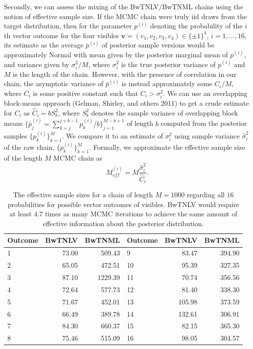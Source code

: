 \documentclass[AMS,STIX1COL]{WileyNJD-v2}
\begin{document}
Secondly, we can assess the mixing of the BwTNLV/BwTNML chains using the
notion of effective sample size. If the MCMC chain were truly iid draws
from the target distribution, then for the parameter \(p^{(i)}\)
denoting the probability of the \(i\)th vector outcome for the four
visibles \(\mathbf{v}=(v_1,v_2,v_3,v_4)\in\{\pm 1\}^4\),
\(i=1,\ldots,16\), its estimate as the average \(\bar{p}^{(i)}\) of
posterior sample versions would be approximately Normal with mean given
by the posterior marginal mean of \(p^{(i)}\), and variance given by
\(\sigma^2_i/M\), where \(\sigma^2_i\) is the true posterior variance of
\(p^{(i)}\) and \(M\) is the length of the chain. However, with the
presence of correlation in our chain, the asymptotic variance of
\(\bar{p}^{(i)}\) is instead approximately some \(C_i/M\), where \(C_i\)
is some positive constant such that \(C_i > \sigma^2_i\). We can use an
overlapping block-means approach (Gelman, Shirley, and others 2011) to
get a crude estimate for \(C_i\) as \(\hat{C}_i = bS_b^2\), where
\(S_b^2\) denotes the sample variance of overlapping block means
\(\{\bar{p}_j^{(i)}=\sum_{k=j}^{j+b-1} p_k^{(i)}/b\}_{j=1}^{M-b+1}\) of
length \(b\) computed from the posterior samples
\(\{p_k^{(i)}\}_{k=1}^M\). We compare it to an estimate of
\(\sigma^2_i\) using sample variance \(\hat{\sigma}^2_i\) of the raw
chain, \(\{p_k^{(i)}\}_{k=1}^{M}\). Formally, we approximate the
effective sample size of the length \(M\) MCMC chain as \[
M_{eff}^{(i)} = M\frac{\hat{\sigma}^2_i}{\hat{C}_i}.
\]

\begin{table}[ht]
\centering
\begin{tabular}{lrrlrr}
  \hline
Outcome & BwTNLV & BwTNML & Outcome & BwTNLV & BwTNML \\ 
  \hline
1 & 73.00 & 509.43 & 9 & 83.47 & 394.90 \\ 
  2 & 65.05 & 472.51 & 10 & 95.39 & 327.35 \\ 
  3 & 87.10 & 1229.39 & 11 & 70.74 & 356.56 \\ 
  4 & 72.64 & 577.73 & 12 & 81.40 & 338.30 \\ 
  5 & 71.67 & 452.01 & 13 & 105.98 & 373.59 \\ 
  6 & 66.49 & 389.78 & 14 & 132.61 & 306.91 \\ 
  7 & 84.30 & 660.37 & 15 & 82.15 & 365.30 \\ 
  8 & 75.46 & 515.09 & 16 & 98.05 & 304.57 \\ 
   \hline
\end{tabular}
\caption{The effective sample sizes for a chain of length $M = 1000$ regarding all $16$ probabilities for possible vector outcomes of visibles. BwTNLV would require at least $4.7$ times as many MCMC iterations to achieve the same amount of effective information about the posterior distribution.} 
\label{tab:m-eff}
\end{table}
\end{document}
